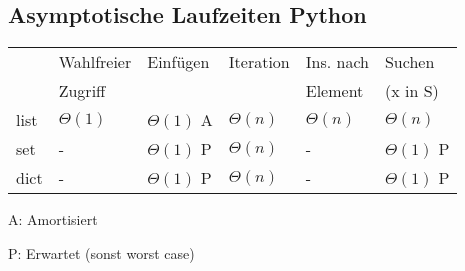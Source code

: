 \begin{sectionbox}
\subsection{Asymptotische Laufzeiten Python}\medskip

\begin{tabular*}{\columnwidth}{@{\extracolsep\fill}llllll@{}}
	 & Wahlfreier & Einfügen & Iteration & Ins. nach & Suchen \\ 
	 & Zugriff & & & Element & (x in S) \\ \cmrule
	list & $\Theta(1)$ & $\Theta(1)$ A &  $\Theta(n)$ &  $\Theta(n)$ &  $\Theta(n)$ \\
	set & - & $\Theta(1)$ P & $\Theta(n)$ & - & $\Theta(1)$ P\\
	dict & - & $\Theta(1)$ P & $\Theta(n)$ & - & $\Theta(1)$ P \\
\end{tabular*}\par\smallskip
A: Amortisiert\par
P: Erwartet (sonst worst case)
\end{sectionbox}
